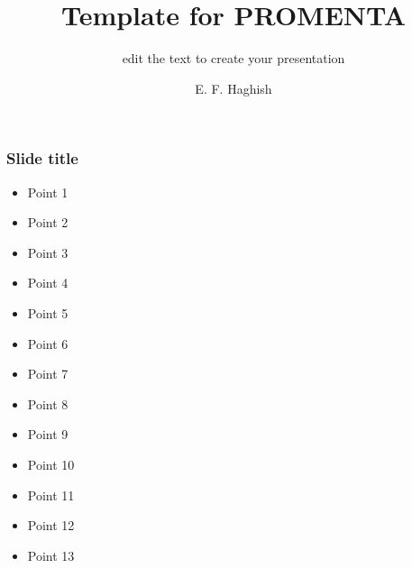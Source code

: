 \documentclass[english]{beamer}
\title{Template for PROMENTA}
\subtitle{edit the text to create your presentation}
\author{E. F. Haghish}
\begin{document}
\maketitle


\begin{frame}
\frametitle{Slide title}
\begin{itemize}
\item Point 1
\item Point 2
\item Point 3
\item Point 4
\item Point 5
\item Point 6
\item Point 7
\item Point 8
\item Point 9
\item Point 10
\item Point 11
\item Point 12
\item Point 13
\end{itemize}

\end{frame}
\end{document}
